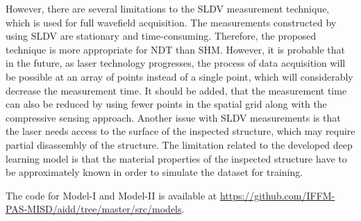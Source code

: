 \begin{sloppypar}
	However, there are several limitations to the SLDV measurement technique, which is used for full wavefield acquisition.
	The measurements constructed by using SLDV are stationary and time-consuming.
	Therefore, the proposed technique is more appropriate for NDT than SHM.
	However, it is probable that in the future, as laser technology progresses, the process of data acquisition will be possible at an array of points instead of a single point, which will considerably decrease the measurement time.
	It should be added, that the measurement time can also be reduced by using fewer points in the spatial grid along with the compressive sensing approach.
	Another issue with SLDV measurements is that the laser needs access to the surface of the inspected structure, which may require partial disassembly of the structure.
	The limitation related to the developed deep learning model is that the material properties of the inspected structure have to be approximately known in order to simulate the dataset for training.
	
	The code for Model-I and Model-II is available at \url{https://github.com/IFFM-PAS-MISD/aidd/tree/master/src/models}.
\end{sloppypar}
